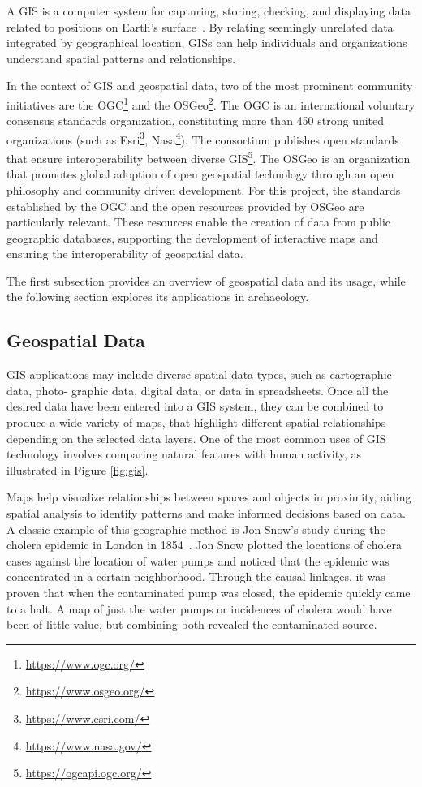A \acrfull{GIS} is a computer system for capturing, storing, checking, and displaying data related to positions on Earth’s 
surface~\cite{natgeo_2024}. By relating seemingly unrelated data integrated by geographical location, \glspl{GIS} can help individuals and organizations understand spatial patterns and relationships.

In the context of \gls{GIS} and geospatial data, two of the most prominent community initiatives are the \gls{OGC}\footnote{\url{https://www.ogc.org/}} and the \gls{OSGeo}\footnote{\url{https://www.osgeo.org/}}.  
The \gls{OGC} is an international voluntary consensus standards organization, constituting more than 450 strong united organizations (such as Esri\footnote{\url{https://www.esri.com/}}, Nasa\footnote{\url{https://www.nasa.gov/}}). The consortium publishes open standards that ensure interoperability between diverse \gls{GIS}\footnote{\url{https://ogcapi.ogc.org/}}.
The \gls{OSGeo} is an organization that promotes global adoption of open geospatial technology through an open philosophy and community driven development. 
For this project, the standards established by the \gls{OGC} and the open resources provided by \gls{OSGeo} are particularly relevant. 
These resources enable the creation of data from public geographic databases, supporting the development of interactive maps and ensuring the interoperability of geospatial data.

The first subsection provides an overview of geospatial data and its usage, while the following section explores its applications in archaeology.

\subsection{Geospatial Data} 
\label{sub:geospatial_data}

\gls{GIS} applications may include diverse spatial data types, such as cartographic data, photo-
graphic data, digital data, or data in spreadsheets. Once all the desired data have been
entered into a \gls{GIS} system, they can be combined to produce a wide variety of maps,
that highlight different spatial relationships depending on the selected data layers. 
One of the most common uses of
\gls{GIS} technology involves comparing natural features with human activity, as illustrated in Figure \ref{fig:gis}.

Maps help visualize relationships between spaces and objects in proximity, aiding spatial analysis to identify patterns and make informed decisions based on data.
A classic example of this geographic method is Jon Snow's study during the cholera epidemic in London in 1854~\cite{inbook}. Jon Snow plotted the locations of cholera cases against the location of water pumps and noticed that the epidemic was concentrated in a certain neighborhood. 
Through the causal linkages, it was proven that when the contaminated pump was closed, the epidemic quickly came to a halt. 
A map of just the water pumps or incidences of cholera would have been of little value, but combining both revealed the contaminated source. 

